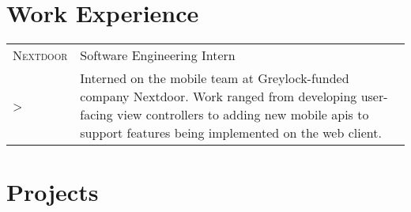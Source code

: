\documentclass[a4paper, oneside, final]{scrartcl} %
\newcommand{\gray}{\rowcolor[gray]{.90}} %
\begin{document}
\begin{center}


\section{Work Experience}

\begin{tabularx}{0.97\linewidth}{>{\raggedleft\scshape}p{2.0cm}X}
    \gray Nextdoor & Software Engineering Intern \\
  >& Interned on the mobile team at Greylock-funded company Nextdoor.  Work ranged from developing user-facing view controllers to adding new mobile apis to support features being implemented on the web client.\\
\end{tabularx}

\section{Projects}


\end{center}
\end{document}
